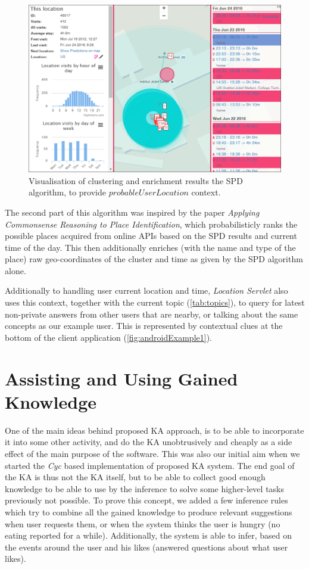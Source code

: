 \begin{figure}[htb]
	\centering
		\includegraphics[width=1\textwidth]{figures/nextPin.png}
	\caption{Visualisation of clustering and enrichment results the SPD
algorithm, to provide $probableUserLocation$ context.}
	\label{fig:nextPin}
\end{figure}

The second part of this algorithm was inspired by the paper \emph{Applying 
Commonsense Reasoning to Place Identification}\parencite{Mamei2010}, which
probabilisticly ranks the possible places acquired from online APIs based on the
SPD results and current time of the day. This then additionally enriches (with
the name and type of the place) raw geo-coordinates of the cluster and time 
as given by the SPD algorithm alone. 

Additionally to handling user current location and time, 
\emph{Location Servlet} also uses this context, together with the current topic
(\autoref{tab:topics}), to query for latest non-private answers from other
users that are nearby, or talking about the same concepts as our example user.
This is represented by contextual clues at the bottom of the client application
(\autoref{fig:androidExample1}).

\section{Assisting and Using Gained Knowledge}
\label{section:usage}

One of the main ideas behind proposed KA approach, is to be able to incorporate
it into some other activity, and do the KA unobtrusively and cheaply as a side
effect of the main purpose of the software. This was also our initial aim when
we started the \emph{Cyc} based implementation of proposed KA system. The end 
goal of the KA is thus not the KA itself, but to be able to collect good 
enough knowledge to be able to use by the inference to solve some higher-level 
tasks previously not possible. To prove this concept, we added a few inference 
rules which try to combine all the gained knowledge to produce relevant 
suggestions when user requests them, or when the system thinks the user is 
hungry (no eating reported for a while). Additionally, the system is able to 
infer, based on the events around the user and his likes (answered questions 
about what user likes).

